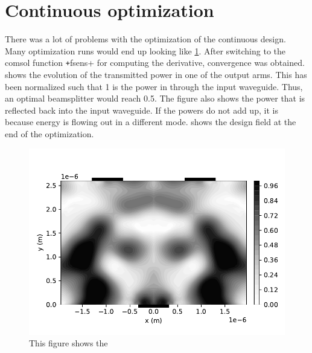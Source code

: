 \section{Continuous optimization}\label{sec:res_cont}

There was a lot of problems with the optimization of the continuous design.
Many optimization runs would end up looking like \cref{fig:bad_cont_conv}.
After switching to the comsol function \texttt+fsens+ for computing
the derivative, convergence was obtained.
 shows the evolution of the transmitted power in one of the
output arms.
This has been normalized such that 1 is the power in through the input waveguide.
Thus, an optimal beamsplitter would reach 0.5.
The figure also shows the power that is reflected back into the input waveguide.
If the powers do not add up, it is because energy is flowing out in a different
mode.
 shows the design field at the end of the optimization.

\begin{figure}[htpb]
	\centering
	\caption{}
	\label{fig:bad_cont_conv}
\end{figure}

\begin{figure}[htpb]
	\centering
	\includegraphics{chapters/results/cont_design1.pdf}
	\caption{This figure shows the }
	\label{fig:cont_design1}
\end{figure}

\begin{figure}[htpb]
	\centering
	\caption{}
	\label{fig:cont_conv1}
\end{figure}

